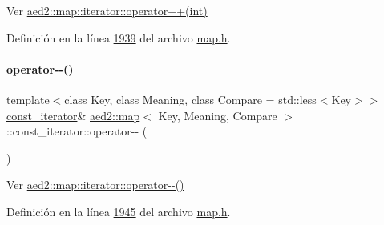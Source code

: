 Ver \hyperlink{classaed2_1_1map_1_1iterator_af4fe5565eb478cfccd254b2ef230b974_af4fe5565eb478cfccd254b2ef230b974}{aed2\+::map\+::iterator\+::operator++(int)} 



Definición en la línea \hyperlink{map_8h_source_l01939}{1939} del archivo \hyperlink{map_8h_source}{map.\+h}.

\mbox{\label{classaed2_1_1map_1_1const__iterator_ae12d6608eeca05957fa3de3f50287c90_ae12d6608eeca05957fa3de3f50287c90}} 
\paragraph{\texorpdfstring{operator-\/-\/()}{operator--()}\hspace{0.1cm}{\footnotesize\ttfamily [1/2]}}
{\footnotesize\ttfamily template$<$class Key, class Meaning, class Compare = std\+::less$<$\+Key$>$$>$ \\
\hyperlink{classaed2_1_1map_1_1const__iterator}{const\+\_\+iterator}\& \hyperlink{classaed2_1_1map}{aed2\+::map}$<$ Key, Meaning, Compare $>$\+::const\+\_\+iterator\+::operator-\/-\/ (\begin{DoxyParamCaption}{ }\end{DoxyParamCaption})\hspace{0.3cm}{\ttfamily [inline]}}



Ver \hyperlink{classaed2_1_1map_1_1iterator_ae7f70f71545d2a9de17b65edaaec748a_ae7f70f71545d2a9de17b65edaaec748a}{aed2\+::map\+::iterator\+::operator-\/-\/()} 



Definición en la línea \hyperlink{map_8h_source_l01945}{1945} del archivo \hyperlink{map_8h_source}{map.\+h}.

\mbox{\label{classaed2_1_1map_1_1const__iterator_ad5ae1cb1d000ac1f528ff32f9af3e228_ad5ae1cb1d000ac1f528ff32f9af3e228}} 
